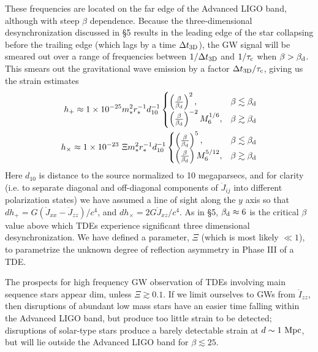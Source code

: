 \documentclass[useAMS, twocolumn, usenatbib]{mn2e}
\begin{document}
These frequencies are located on the far edge of the Advanced LIGO band, although with steep $\beta$ dependence.  Because the three-dimensional desynchronization discussed in \S 5 results in the leading edge of the star collapsing before the trailing edge (which lags by a time $\Delta t_{\rm 3D}$),  the GW signal will be smeared out over a range of frequencies between $1/\Delta t_{\rm 3D}$ and $1/\tau_{\rm c}$ when $\beta>\beta_{\rm d}$.  This smears out the gravitational wave emission by a factor $\Delta t_{\rm 3D}/\tau_{\rm c}$, giving us the strain estimates
\begin{align}
{h}_{+} \approx 1\times 10^{-25} m_*^2 r_*^{-1}  d_{10}^{-1}
\begin{cases}
\left( \frac{\beta}{\beta_{\rm d}} \right)^{2}, &\beta \lesssim \beta_{\rm d} \\
\left(\frac{\beta}{\beta_{\rm d}} \right)^{-2}M_6^{1/6}, &\beta \gtrsim \beta_{\rm d}
\end{cases} 
\\
{h}_{\times} \approx 1\times 10^{-23} ~\Xi m_*^2 r_*^{-1}  d_{10}^{-1}
\begin{cases}
\left( \frac{\beta}{\beta_{\rm d}} \right)^{5}, &\beta \lesssim \beta_{\rm d} \\
\left(\frac{\beta}{\beta_{\rm d}} \right) M_6^{5/12}, &\beta \gtrsim \beta_{\rm d}
\end{cases} 
\end{align}
Here $d_{10}$ is distance to the source normalized to 10 megaparsecs, and for clarity (i.e. to separate diagonal and off-diagonal components of $\ddot{J}_{ij}$ into different polarization states) we have assumed a line of sight along the $y$ axis so that $dh_+=G(\ddot{J}_{xx}-\ddot{J}_{zz})/c^4$, and $dh_{\times}=2G\ddot{J}_{xz}/c^4$.  As in \S 5, $\beta_{\rm d} \approx 6$ is the critical $\beta$ value above which TDEs experience significant three dimensional desynchronization.  We have defined a parameter, $\Xi$ (which is most likely $\ll 1$), to parametrize the unknown degree of reflection asymmetry in Phase III of a TDE.  

The prospects for high frequency GW observation of TDEs involving main sequence stars appear dim, unless $\Xi \gtrsim 0.1$.  If we limit ourselves to GWs from $\ddot{I}_{zz}$, then disruptions of abundant low mass stars have an easier time falling within the Advanced LIGO band, but produce too little strain to be detected; disruptions of solar-type stars produce a barely detectable strain at $d\sim 1~{\rm Mpc}$, but will lie outside the Advanced LIGO band for $\beta \lesssim 25$.
\end{document}
